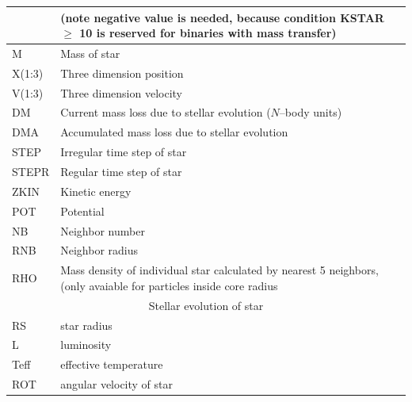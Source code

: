 \begin{longtable}{|p{0.7in}|p{4.3in}|}
          & (note negative value is needed, because condition KSTAR $\ge$ 10 is reserved for binaries with mass transfer)
          \\\hline
    M     & Mass of star \\\hline
    X(1:3)& Three dimension position \\\hline
    V(1:3)& Three dimension velocity \\\hline
    DM    & Current mass loss due to stellar evolution ($N$--body units)\\\hline
    DMA   & Accumulated mass loss due to stellar evolution \\\hline
    STEP  & Irregular time step of star\\\hline
    STEPR & Regular time step of star\\\hline
    ZKIN  & Kinetic energy \\\hline
    POT   & Potential \\\hline
    NB    & Neighbor number \\\hline
    RNB   & Neighbor radius \\\hline
    RHO   & Mass density of individual star calculated by nearest 5 neighbors, (only avaiable for particles inside core radius \\\hline
    \hline

    \multicolumn{2}{|c|}{ Stellar evolution of star } \\\hline    
    RS    & star radius \\\hline
    L     & luminosity \\\hline
    Teff  & effective temperature \\\hline
    ROT   & angular velocity of star \\\hline
    \hline


\end{longtable}
